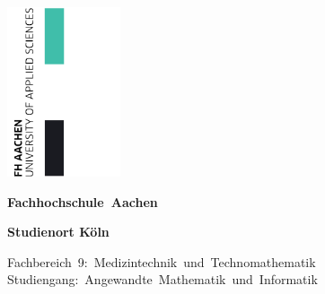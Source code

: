 \begin{titlepage}
	\setlength{\parindent}{0pt} %

	\begin{flushright}
		\includegraphics[height=5cm]{images/FH-Aachen-r_svg-raw}
	\end{flushright}
	
	\vspace*{-2.5cm}

	\begin{center}
		\textbf{\Huge Fachhochschule~Aachen}

		\vspace*{0.5cm}
		
		\textbf{\Huge Studienort Köln}

		\vspace*{0.75cm}

		{\normalsize\doublespacing Fachbereich~9:~Medizintechnik~und~Technomathematik\\	Studiengang:~Angewandte~Mathematik~und~Informatik}

		\vspace*{2.5cm} %
		
		\begin{minipage}[t]{14cm} %
			\begin{center}
				\textbf{\Huge \titleDocument}
			\end{center}
		\end{minipage}
	
		\vspace*{2.5cm} %
		

\end{center}
\end{titlepage}
